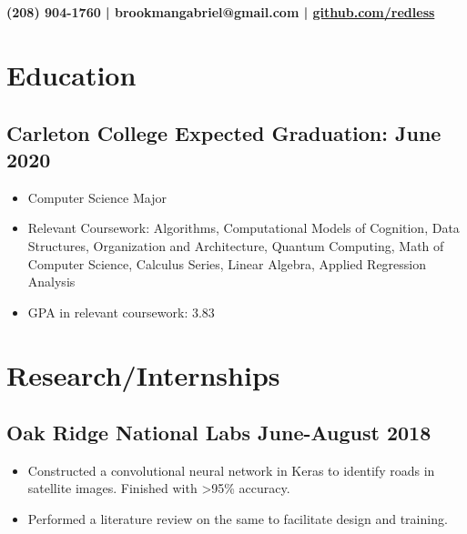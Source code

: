 \documentclass{article}
\begin{document}
{\selectfont

\section*{}
\begin{center}\textbf{(208) 904-1760 | brookmangabriel@gmail.com | \href{https://github.com/redless}{github.com/redless}}\end{center}
\section*{Education}

  \subsection*{Carleton College \hfill Expected Graduation: June 2020} 
  \begin{itemize}

  \item Computer Science Major
\item
  Relevant Coursework: Algorithms, Computational Models of Cognition, Data Structures, Organization and
  Architecture, Quantum Computing, Math of Computer Science, Calculus Series, Linear Algebra, Applied Regression
  Analysis
  
\item GPA in relevant coursework: 3.83
\end{itemize}

\section*{Research/Internships}

\subsection*{\indent Oak Ridge National Labs \hfill June-August 2018}
\begin{itemize}
\item
  Constructed a convolutional neural network in Keras to identify roads
  in satellite images. Finished
  with \textgreater{}95\% accuracy.

  
 \item Performed a literature review on the same to facilitate design and training.


\end{itemize}}
\end{document}
